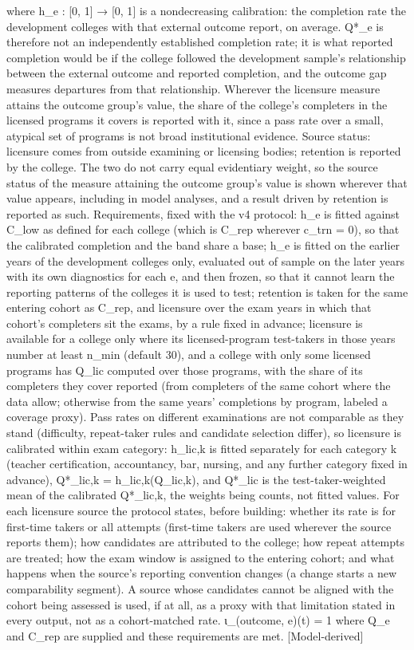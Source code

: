 \documentclass[
]{article}
\begin{document}
where h\_e : {[}0, 1{]} → {[}0, 1{]} is a nondecreasing calibration: the
completion rate the development colleges with that external outcome
report, on average. Q*\_e is therefore not an independently established
completion rate; it is what reported completion would be if the college
followed the development sample's relationship between the external
outcome and reported completion, and the outcome gap measures departures
from that relationship. Wherever the licensure measure attains the
outcome group's value, the share of the college's completers in the
licensed programs it covers is reported with it, since a pass rate over
a small, atypical set of programs is not broad institutional evidence.
Source status: licensure comes from outside examining or licensing
bodies; retention is reported by the college. The two do not carry equal
evidentiary weight, so the source status of the measure attaining the
outcome group's value is shown wherever that value appears, including in
model analyses, and a result driven by retention is reported as such.
Requirements, fixed with the v4 protocol: h\_e is fitted against C\_low
as defined for each college (which is C\_rep wherever c\_trn = 0), so
that the calibrated completion and the band share a base; h\_e is fitted
on the earlier years of the development colleges only, evaluated out of
sample on the later years with its own diagnostics for each e, and then
frozen, so that it cannot learn the reporting patterns of the colleges
it is used to test; retention is taken for the same entering cohort as
C\_rep, and licensure over the exam years in which that cohort's
completers sit the exams, by a rule fixed in advance; licensure is
available for a college only where its licensed-program test-takers in
those years number at least n\_min (default 30), and a college with only
some licensed programs has Q\_lic computed over those programs, with the
share of its completers they cover reported (from completers of the same
cohort where the data allow; otherwise from the same years' completions
by program, labeled a coverage proxy). Pass rates on different
examinations are not comparable as they stand (difficulty, repeat-taker
rules and candidate selection differ), so licensure is calibrated within
exam category: h\_lic,k is fitted separately for each category k
(teacher certification, accountancy, bar, nursing, and any further
category fixed in advance), Q*\_lic,k = h\_lic,k(Q\_lic,k), and Q*\_lic
is the test-taker-weighted mean of the calibrated Q*\_lic,k, the weights
being counts, not fitted values. For each licensure source the protocol
states, before building: whether its rate is for first-time takers or
all attempts (first-time takers are used wherever the source reports
them); how candidates are attributed to the college; how repeat attempts
are treated; how the exam window is assigned to the entering cohort; and
what happens when the source's reporting convention changes (a change
starts a new comparability segment). A source whose candidates cannot be
aligned with the cohort being assessed is used, if at all, as a proxy
with that limitation stated in every output, not as a cohort-matched
rate. ι\_(outcome, e)(t) = 1 where Q\_e and C\_rep are supplied and
these requirements are met. {[}Model-derived{]}
\end{document}
